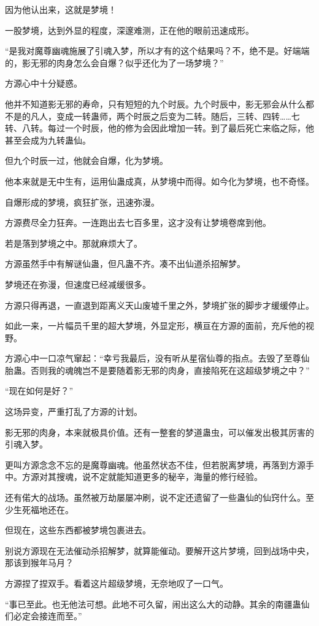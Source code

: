 \begin{this_body}
因为他认出来，这就是梦境！

一股梦境，达到外显的程度，深邃难测，正在他的眼前迅速成形。

“是我对魔尊幽魂施展了引魂入梦，所以才有的这个结果吗？不，绝不是。好端端的，影无邪的肉身怎么会自爆？似乎还化为了一场梦境？”

方源心中十分疑惑。

他并不知道影无邪的寿命，只有短短的九个时辰。九个时辰中，影无邪会从什么都不是的凡人，变成一转蛊师，两个时辰之后变为二转。随后，三转、四转……七转、八转。每过一个时辰，他的修为会因此增加一转。到了最后死亡来临之际，他甚至会成为九转蛊仙。

但九个时辰一过，他就会自爆，化为梦境。

他本来就是无中生有，运用仙蛊成真，从梦境中而得。如今化为梦境，也不奇怪。

自爆形成的梦境，疯狂扩张，迅速弥漫。

方源费尽全力狂奔。一连跑出去七百多里，这才没有让梦境卷席到他。

若是落到梦境之中。那就麻烦大了。

方源虽然手中有解谜仙蛊，但凡蛊不齐。凑不出仙道杀招解梦。

梦境还在弥漫，但速度已经减缓很多。

方源只得再退，一直退到距离义天山废墟千里之外，梦境扩张的脚步才缓缓停止。

如此一来，一片幅员千里的超大梦境，外显定形，横亘在方源的面前，充斥他的视野。

方源心中一口凉气窜起：“幸亏我最后，没有听从星宿仙尊的指点。去毁了至尊仙胎蛊。否则我的魂魄岂不是要随着影无邪的肉身，直接陷死在这超级梦境之中？”

“现在如何是好？”

这场异变，严重打乱了方源的计划。

影无邪的肉身，本来就极具价值。还有一整套的梦道蛊虫，可以催发出极其厉害的引魂入梦。

更叫方源念念不忘的是魔尊幽魂。他虽然状态不佳，但若脱离梦境，再落到方源手中。方源对其搜魂，说不定就能知道更多的秘辛，海量的修行经验。

还有偌大的战场。虽然被万劫屡屡冲刷，说不定还遗留了一些蛊仙的仙窍什么。至少生死福地还在。

但现在，这些东西都被梦境包裹进去。

别说方源现在无法催动杀招解梦，就算能催动。要解开这片梦境，回到战场中央，那该到猴年马月？

方源捏了捏双手。看着这片超级梦境，无奈地叹了一口气。

“事已至此。也无他法可想。此地不可久留，闹出这么大的动静。其余的南疆蛊仙们必定会接连而至。”


\end{this_body}
